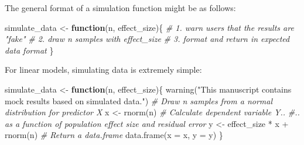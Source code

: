 \documentclass[psych,tutorial,accept,moreauthors,pdftex]{Definitions/mdpi}
\newenvironment{Shaded}{\begin{snugshade}}{\end{snugshade}}
\newcommand{\AttributeTok}[1]{\textcolor[rgb]{0.77,0.63,0.00}{#1}}
\newcommand{\CommentTok}[1]{\textcolor[rgb]{0.56,0.35,0.01}{\textit{#1}}}
\newcommand{\ControlFlowTok}[1]{\textcolor[rgb]{0.13,0.29,0.53}{\textbf{#1}}}
\newcommand{\FunctionTok}[1]{\textcolor[rgb]{0.00,0.00,0.00}{#1}}
\newcommand{\NormalTok}[1]{#1}
\newcommand{\OtherTok}[1]{\textcolor[rgb]{0.56,0.35,0.01}{#1}}
\newcommand{\SpecialCharTok}[1]{\textcolor[rgb]{0.00,0.00,0.00}{#1}}
\newcommand{\StringTok}[1]{\textcolor[rgb]{0.31,0.60,0.02}{#1}}
\begin{document}
\begin{paracol}{2}
The general format of a simulation function might be as follows:

\begin{adjustwidth}{0.5cm}{0cm} 
\begin{Shaded}
\begin{Highlighting}[]
\NormalTok{simulate\_data }\OtherTok{\textless{}{-}} \ControlFlowTok{function}\NormalTok{(n, effect\_size)\{}
  \CommentTok{\# 1. warn users that the results are "fake"}
  \CommentTok{\# 2. draw \textasciigrave{}n\textasciigrave{} samples with \textasciigrave{}effect\_size\textasciigrave{}}
  \CommentTok{\# 3. format and return in expected data format}
\NormalTok{\}}
\end{Highlighting}
\end{Shaded}
\end{adjustwidth}

For linear models, simulating data is extremely simple:

\vspace{+6pt}
\end{paracol}
\nointerlineskip
\begin{adjustwidth}{0.5cm}{0cm} 
\begin{Shaded}
\begin{Highlighting}[]
\NormalTok{simulate\_data }\OtherTok{\textless{}{-}} \ControlFlowTok{function}\NormalTok{(n, effect\_size)\{}
  \FunctionTok{warning}\NormalTok{(}\StringTok{"This manuscript contains mock results based on simulated data."}\NormalTok{)}
  \CommentTok{\# Draw n samples from a normal distribution for predictor X}
\NormalTok{  x }\OtherTok{\textless{}{-}} \FunctionTok{rnorm}\NormalTok{(n)}
  \CommentTok{\# Calculate dependent variable Y..}
  \CommentTok{\#.. as a function of population effect size and residual error}
\NormalTok{  y }\OtherTok{\textless{}{-}}\NormalTok{ effect\_size }\SpecialCharTok{*}\NormalTok{ x }\SpecialCharTok{+} \FunctionTok{rnorm}\NormalTok{(n)}
  \CommentTok{\# Return a data.frame}
  \FunctionTok{data.frame}\NormalTok{(}\AttributeTok{x =}\NormalTok{ x, }\AttributeTok{y =}\NormalTok{ y)}
\NormalTok{\}}
\end{Highlighting}
\end{Shaded}
\end{adjustwidth}
\end{document}
